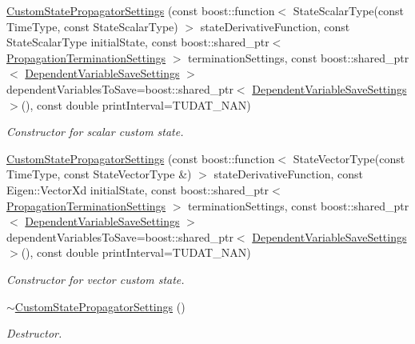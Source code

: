 \begin{DoxyCompactItemize}
\item 
\hyperlink{classtudat_1_1propagators_1_1CustomStatePropagatorSettings_a2fc6442292352bc3691476c6f043ceba}{Custom\+State\+Propagator\+Settings} (const boost\+::function$<$ State\+Scalar\+Type(const Time\+Type, const State\+Scalar\+Type) $>$ state\+Derivative\+Function, const State\+Scalar\+Type initial\+State, const boost\+::shared\+\_\+ptr$<$ \hyperlink{classtudat_1_1propagators_1_1PropagationTerminationSettings}{Propagation\+Termination\+Settings} $>$ termination\+Settings, const boost\+::shared\+\_\+ptr$<$ \hyperlink{classtudat_1_1propagators_1_1DependentVariableSaveSettings}{Dependent\+Variable\+Save\+Settings} $>$ dependent\+Variables\+To\+Save=boost\+::shared\+\_\+ptr$<$ \hyperlink{classtudat_1_1propagators_1_1DependentVariableSaveSettings}{Dependent\+Variable\+Save\+Settings} $>$(), const double print\+Interval=T\+U\+D\+A\+T\+\_\+\+N\+AN)
\begin{DoxyCompactList}\small\item\em Constructor for scalar custom state. \end{DoxyCompactList}\item 
\hyperlink{classtudat_1_1propagators_1_1CustomStatePropagatorSettings_af950dd4a22f803acc16ee8cfc8897242}{Custom\+State\+Propagator\+Settings} (const boost\+::function$<$ State\+Vector\+Type(const Time\+Type, const State\+Vector\+Type \&) $>$ state\+Derivative\+Function, const Eigen\+::\+Vector\+Xd initial\+State, const boost\+::shared\+\_\+ptr$<$ \hyperlink{classtudat_1_1propagators_1_1PropagationTerminationSettings}{Propagation\+Termination\+Settings} $>$ termination\+Settings, const boost\+::shared\+\_\+ptr$<$ \hyperlink{classtudat_1_1propagators_1_1DependentVariableSaveSettings}{Dependent\+Variable\+Save\+Settings} $>$ dependent\+Variables\+To\+Save=boost\+::shared\+\_\+ptr$<$ \hyperlink{classtudat_1_1propagators_1_1DependentVariableSaveSettings}{Dependent\+Variable\+Save\+Settings} $>$(), const double print\+Interval=T\+U\+D\+A\+T\+\_\+\+N\+AN)
\begin{DoxyCompactList}\small\item\em Constructor for vector custom state. \end{DoxyCompactList}\item 
\hyperlink{classtudat_1_1propagators_1_1CustomStatePropagatorSettings_a7031a1e5695f3be5b81615dd98fbe2d9}{$\sim$\+Custom\+State\+Propagator\+Settings} ()\hypertarget{classtudat_1_1propagators_1_1CustomStatePropagatorSettings_a7031a1e5695f3be5b81615dd98fbe2d9}{}\label{classtudat_1_1propagators_1_1CustomStatePropagatorSettings_a7031a1e5695f3be5b81615dd98fbe2d9}

\begin{DoxyCompactList}\small\item\em Destructor. \end{DoxyCompactList}\end{DoxyCompactItemize}
